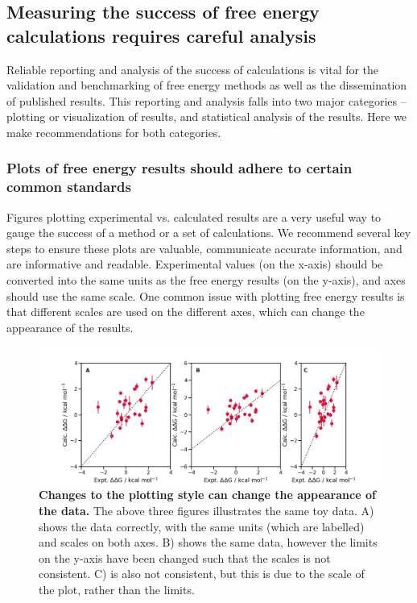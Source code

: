 \documentclass[9pt,bestpractices]{livecoms}
\begin{document}

\subsection{Measuring the success of free energy calculations requires careful analysis}
Reliable reporting and analysis of the success of calculations is vital for the validation and benchmarking of free energy methods as well as the dissemination of published results. This reporting and analysis falls into two major categories -- plotting or visualization of results, and statistical analysis of the results. Here we make recommendations for both categories.

\subsubsection{Plots of free energy results should adhere to certain common standards}
\label{sec:plotting_results}
Figures plotting experimental vs. calculated results are a very useful way to gauge the success of a method or a set of calculations. We recommend several key steps to ensure these plots are valuable, communicate accurate information, and are informative and readable. Experimental values (on the x-axis) should be converted into the same units as the free energy results (on the y-axis), and axes should use the same scale. One common issue with plotting free energy results is that different scales are used on the different axes, which can change the appearance of the results.

\begin{figure}
    \includegraphics[width=0.95\linewidth]{figures/plotting-basics.png}
    \caption{\textbf{Changes to the plotting style can change the appearance of the data.} The above three figures illustrates the same toy data. A) shows the data correctly, with the same units (which are labelled) and scales on both axes. B) shows the same data, however the limits on the y-axis have been changed such that the scales is not consistent. C) is also not consistent, but this is due to the scale of the plot, rather than the limits.}
    \label{fig:plotting-basics}
\end{figure}
\end{document}
